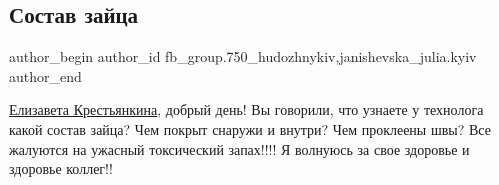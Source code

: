  
 
 
 
 

\subsection{Состав зайца}
\label{sec:09_03_2018.fb.fb_group.750_hudozhnykiv.1.sostav_zaitsa}
 
\ifcmt
 author_begin
   author_id fb_group.750_hudozhnykiv,janishevska_julia.kyiv
 author_end
\fi

\href{https://www.facebook.com/groups/1013559558679300/user/100001359234807}{Елизавета
Крестьянкина}, добрый день! Вы говорили, что узнаете у технолога какой состав
зайца? Чем покрыт снаружи и внутри? Чем проклеены швы? Все жалуются на ужасный
токсический запах!!!! Я волнуюсь за свое здоровье и здоровье коллег!!

